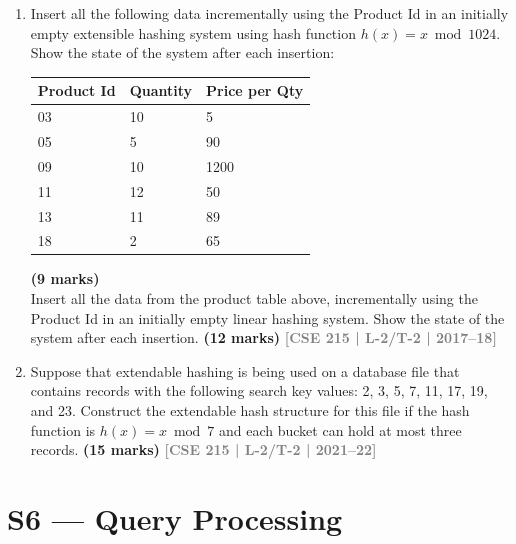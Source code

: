 \documentclass[12pt,a3paper]{article}
\newcommand{\yr}[1]{\hfill\textcolor{gray}{\small\textbf{[#1]}}}
\newcommand{\mk}[1]{\textcolor{orange!70!black}{\small\textbf{(#1 marks)}}}
\begin{document}
\begin{enumerate}
\begin{center}
\begin{tikzpicture}[font=\small]
\end{tikzpicture}
\end{center}
Now, show (step by step) what happens after successive insertion of 0101, 0001 and
0111. Show the necessary calculation whenever a new bucket is required. Overflow
blocks can be used if necessary.
\mk{15} \yr{CSE 303 | L-3/T-1 | 2016--17}

\item Insert all the following data incrementally using the Product Id in an initially empty extensible hashing system using hash function $h(x) = x \bmod 1024$. Show the state of the system after each insertion:

\medskip
\begin{center}
\begin{tabular}{lll}
\toprule
\textbf{Product Id} & \textbf{Quantity} & \textbf{Price per Qty}\\
\midrule
03 & 10 & 5\\
05 & 5 & 90\\
09 & 10 & 1200\\
11 & 12 & 50\\
13 & 11 & 89\\
18 & 2 & 65\\
\bottomrule
\end{tabular}
\end{center}
\mk{9} \\

Insert all the data from the product table above, incrementally using the Product Id in an initially empty linear hashing system. Show the state of the system after each insertion.
\mk{12} \yr{CSE 215 | L-2/T-2 | 2017--18}

\item Suppose that extendable hashing is being used on a database file that contains records with the following search key values: 2, 3, 5, 7, 11, 17, 19, and 23. Construct the extendable hash structure for this file if the hash function is $h(x) = x \bmod 7$ and each bucket can hold at most three records.
\mk{15} \yr{CSE 215 | L-2/T-2 | 2021--22}

\end{enumerate}

\section{S6 --- Query Processing}
\label{sec:S6}
\end{document}
